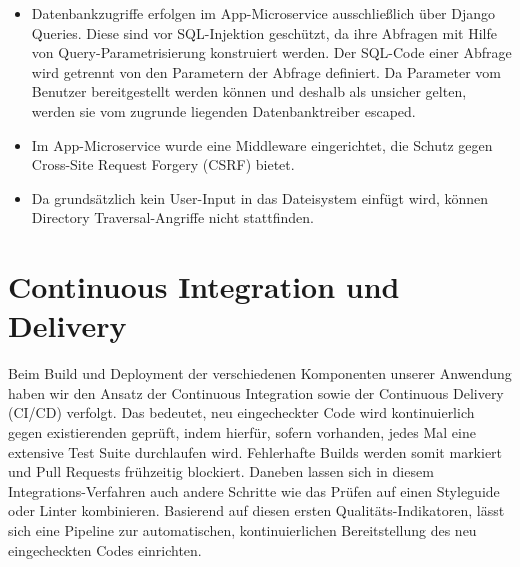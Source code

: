 \documentclass{article}
\begin{document}
\begin{itemize}
    \item Datenbankzugriffe erfolgen im App-Microservice ausschließlich über Django Queries. Diese sind vor SQL-Injektion geschützt, da ihre Abfragen mit Hilfe von Query-Parametrisierung konstruiert werden. Der SQL-Code einer Abfrage wird getrennt von den Parametern der Abfrage definiert. Da Parameter vom Benutzer bereitgestellt werden können und deshalb als unsicher gelten, werden sie vom zugrunde liegenden Datenbanktreiber escaped.~\cite{django-security}
    \item Im App-Microservice wurde eine Middleware eingerichtet, die Schutz gegen Cross-Site Request Forgery (CSRF) bietet.
    \item Da grundsätzlich kein User-Input in das Dateisystem einfügt wird, können Directory Traversal-Angriffe nicht stattfinden.
\end{itemize}




\section{Continuous Integration und Delivery} %

Beim Build und Deployment der verschiedenen Komponenten unserer Anwendung haben wir den Ansatz der Continuous Integration sowie der Continuous Delivery (CI/CD) verfolgt. Das bedeutet, neu eingecheckter Code wird kontinuierlich gegen existierenden geprüft, indem hierfür, sofern vorhanden, jedes Mal eine extensive Test Suite durchlaufen wird. Fehlerhafte Builds werden somit markiert und Pull Requests frühzeitig blockiert. Daneben lassen sich in diesem Integrations-Verfahren auch andere Schritte wie das Prüfen auf einen Styleguide oder Linter kombinieren. Basierend auf diesen ersten Qualitäts-Indikatoren, lässt sich eine Pipeline zur automatischen, kontinuierlichen Bereitstellung des neu eingecheckten Codes einrichten.
\end{document}
